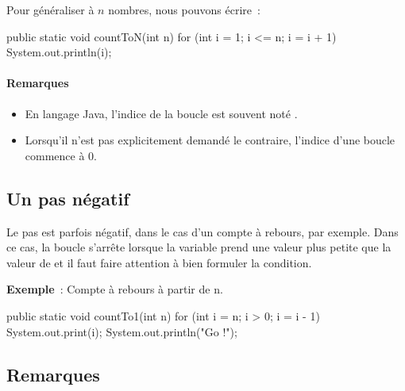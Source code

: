 		Pour généraliser à $n$ nombres, nous pouvons écrire~:
		

		\begin{java}
public static void countToN(int n){
	for (int i = 1; i <= n; i = i + 1){
		System.out.println(i);
	}
}
		\end{java}

		\paragraph{Remarques} 
		\begin{itemize}
			
			\item En langage Java, l'indice de la boucle est souvent noté
				. 

			\item Lorsqu'il n'est pas explicitement demandé le contraire,
				l'indice d'une boucle commence à 0.  
		
\end{itemize}



	\subsection{Un pas négatif}

		Le pas est parfois négatif, dans le cas d’un compte à rebours, par
		exemple.  Dans ce cas, la boucle s’arrête lorsque la variable prend une
		valeur plus petite que la valeur de  et il faut faire attention
		à bien formuler la condition.
		
		\textbf{Exemple}~: Compte à rebours à partir de n.

		\begin{java}
public static void countTo1(int n){
	for (int i = n; i > 0; i = i - 1){
		System.out.print(i);
	}
	System.out.println("Go !");
}
\end{java}

	\subsection{Remarques}


